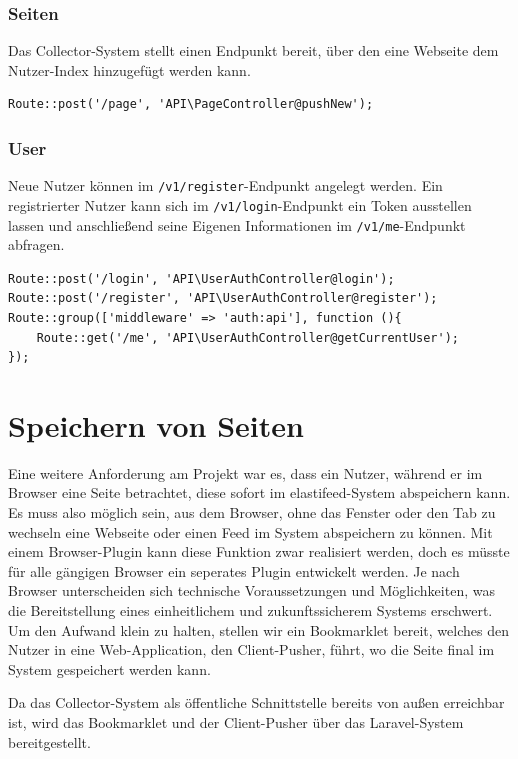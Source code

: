         \subsubsection{Seiten}
            Das Collector-System stellt einen Endpunkt bereit, über den eine Webseite dem Nutzer-Index hinzugefügt werden kann.
            \begin{lstlisting}
Route::post('/page', 'API\PageController@pushNew');
            \end{lstlisting}

        \subsubsection{User}
            Neue Nutzer können im \texttt{/v1/register}-Endpunkt angelegt werden. Ein registrierter Nutzer kann sich im \texttt{/v1/login}-Endpunkt ein Token ausstellen lassen und anschließend seine Eigenen Informationen im \texttt{/v1/me}-Endpunkt abfragen.
            
            \begin{lstlisting}
Route::post('/login', 'API\UserAuthController@login');
Route::post('/register', 'API\UserAuthController@register');
Route::group(['middleware' => 'auth:api'], function (){
    Route::get('/me', 'API\UserAuthController@getCurrentUser');
});
            \end{lstlisting}


\section{Speichern von Seiten}
    Eine weitere Anforderung am Projekt war es, dass ein Nutzer, während er im Browser eine Seite betrachtet, diese sofort im elastifeed-System abspeichern kann. Es muss also möglich sein, aus dem Browser, ohne das Fenster oder den Tab zu wechseln eine Webseite oder einen Feed im System abspeichern zu können. Mit einem Browser-Plugin kann diese Funktion zwar realisiert werden, doch es müsste für alle gängigen Browser ein seperates Plugin entwickelt werden. Je nach Browser unterscheiden sich technische Voraussetzungen und Möglichkeiten, was die Bereitstellung eines einheitlichem und zukunftssicherem Systems erschwert. Um den Aufwand klein zu halten, stellen wir ein Bookmarklet bereit, welches den Nutzer in eine Web-Application, den Client-Pusher, führt, wo die Seite final im System gespeichert werden kann.
    
    Da das Collector-System als öffentliche Schnittstelle bereits von außen erreichbar ist, wird das Bookmarklet und der Client-Pusher über das Laravel-System bereitgestellt.
    
